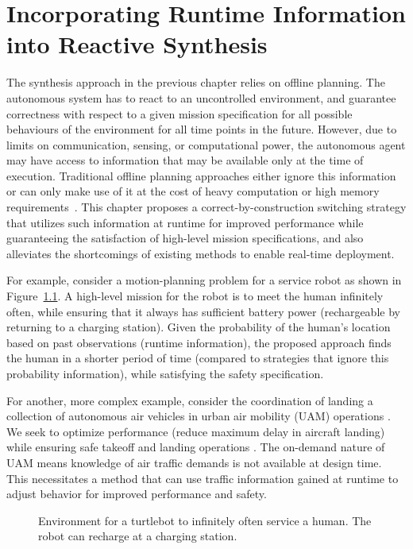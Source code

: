 

\chapter{Incorporating Runtime Information into Reactive Synthesis}
The synthesis approach in the previous chapter relies on offline planning. The autonomous system has to react to an uncontrolled environment, and guarantee correctness with respect to a given mission specification for all possible behaviours of the environment for all time points in the future. However, due to limits on communication, sensing, or computational power, the autonomous agent may have access to information that may be available only at the time of execution. Traditional offline planning approaches either ignore this information or can only make use of it at the cost of heavy computation or high memory requirements~\cite{Ehlerscost,jangcontinuous}. This chapter proposes a correct-by-construction switching strategy that utilizes such information at runtime for improved performance while guaranteeing the satisfaction of high-level mission specifications, and also alleviates the shortcomings of existing methods to enable real-time deployment. 

For example, consider a motion-planning problem for a service robot as shown in Figure~\ref{fig:gazeboworld}. A high-level mission for the robot is to meet the human infinitely often, while ensuring that it always has sufficient battery power (rechargeable by returning to a charging station). Given the probability of the human's location based on past observations (runtime information), the proposed approach finds the human in a shorter period of time (compared to strategies that ignore this probability information), while satisfying the safety specification. 

For another, more complex example, consider the coordination of landing a collection of autonomous air vehicles in urban air mobility (UAM) operations \cite{goyal2018urban,gipson2017nasa}. 
We seek to optimize performance (reduce  maximum delay in aircraft landing) while ensuring safe takeoff and landing operations \cite{thipphavong2018urban}. The on-demand nature of UAM means knowledge of air traffic demands is not available at design time. This necessitates a method that can use traffic information gained at runtime to adjust behavior for improved performance and safety. 

\begin{figure}
     \centering
    
    \caption{Environment for a turtlebot to infinitely often service a human. The robot can recharge at a charging station.}
    \label{fig:gazeboworld}
\end{figure}

